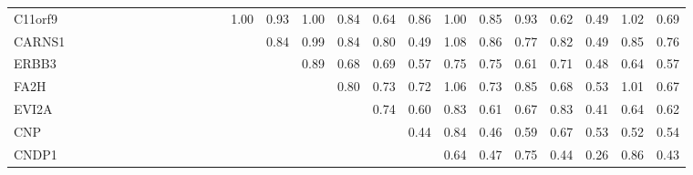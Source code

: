 \begin{longtable}{lrrrrrrrrrrrrrrrrrrrrrrrrr}
C11orf9 &               &             &          &              &            &               &           &            &             &             &              &               &         1.00 &        0.93 &       1.00 &        0.84 &      0.64 &        0.86 &      1.00 &       0.85 &       0.93 &       0.62 &         0.49 &       1.02 &          0.69 \\
CARNS1  &               &             &          &              &            &               &           &            &             &             &              &               &              &        0.84 &       0.99 &        0.84 &      0.80 &        0.49 &      1.08 &       0.86 &       0.77 &       0.82 &         0.49 &       0.85 &          0.76 \\
ERBB3   &               &             &          &              &            &               &           &            &             &             &              &               &              &             &       0.89 &        0.68 &      0.69 &        0.57 &      0.75 &       0.75 &       0.61 &       0.71 &         0.48 &       0.64 &          0.57 \\
FA2H    &               &             &          &              &            &               &           &            &             &             &              &               &              &             &            &        0.80 &      0.73 &        0.72 &      1.06 &       0.73 &       0.85 &       0.68 &         0.53 &       1.01 &          0.67 \\
EVI2A   &               &             &          &              &            &               &           &            &             &             &              &               &              &             &            &             &      0.74 &        0.60 &      0.83 &       0.61 &       0.67 &       0.83 &         0.41 &       0.64 &          0.62 \\
CNP     &               &             &          &              &            &               &           &            &             &             &              &               &              &             &            &             &           &        0.44 &      0.84 &       0.46 &       0.59 &       0.67 &         0.53 &       0.52 &          0.54 \\
CNDP1   &               &             &          &              &            &               &           &            &             &             &              &               &              &             &            &             &           &             &      0.64 &       0.47 &       0.75 &       0.44 &         0.26 &       0.86 &          0.43 \\

\end{longtable}
